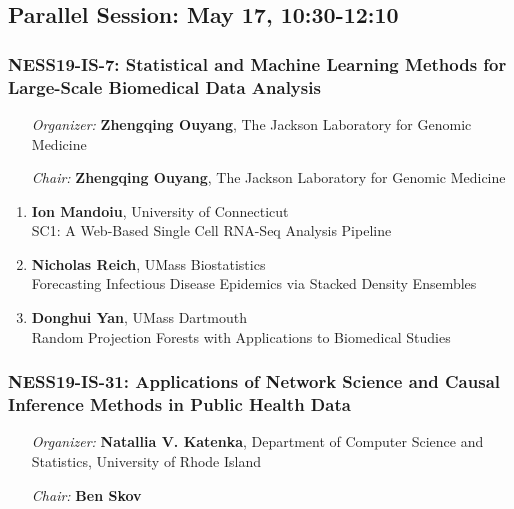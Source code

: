 \subsection*{Parallel Session: May 17, 10:30-12:10}

\subsubsection*{NESS19-IS-7: Statistical and Machine Learning Methods for Large-Scale Biomedical Data Analysis}

\begin{enumerate}[align=left]
\item [\emph{Organizer:}] \textbf{Zhengqing Ouyang}, The Jackson Laboratory for Genomic Medicine
\item [\emph{Chair:}] \textbf{Zhengqing Ouyang}, The Jackson Laboratory for Genomic Medicine
\end{enumerate}

\begin{enumerate}
\item \textbf{Ion Mandoiu}, University of Connecticut \\
SC1: A Web-Based Single Cell RNA-Seq Analysis Pipeline
\item \textbf{Nicholas Reich}, UMass Biostatistics \\
Forecasting Infectious Disease Epidemics via Stacked Density Ensembles
\item \textbf{Donghui Yan}, UMass Dartmouth \\
Random Projection Forests with Applications to Biomedical Studies
\end{enumerate}

\subsubsection*{NESS19-IS-31: Applications of Network Science and Causal Inference Methods in Public Health Data}

\begin{enumerate}[align=left]
\item [\emph{Organizer:}] \textbf{Natallia V. Katenka}, Department of Computer Science and Statistics, University of Rhode Island
\item [\emph{Chair:}] \textbf{Ben Skov}
\end{enumerate}

